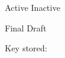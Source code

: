\documentclass{article}
\begin{document}
\makeatletter
\ifkvsample@active
  {Active}
\else
  {Inactive}
\fi

\ifkvsample@final
  {Final}
\else
  {Draft}
\fi

Key stored: \kvsample@key
\makeatother
\end{document}
